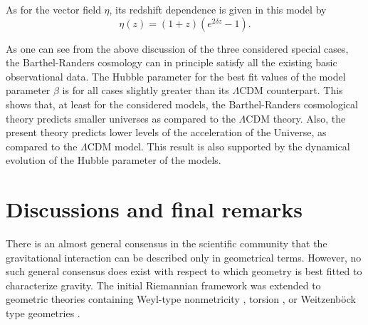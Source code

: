 \documentclass[aps,superscriptaddress, showpacs,preprintnumbers, superscriptaddress, nofootinbibt,twocolumn]{revtex4-2}
\def\be{\begin{equation}}
\def\ee{\end{equation}}
\begin{document}
As for the vector field $\eta$, its redshift dependence is given in this model by
\be
\eta (z)=(1+z)\left(e^{2\delta z}-1\right).
\ee

As one can see from the above discussion of the three considered special cases, the Barthel-Randers cosmology can in principle satisfy all the existing basic observational data. The Hubble parameter for the best fit values of the model parameter $\beta$ is for all cases slightly greater than its $\Lambda$CDM counterpart. This shows that, at least for the considered models, the Barthel-Randers cosmological theory predicts smaller universes as compared to the $\Lambda$CDM theory. Also, the present theory predicts lower levels of the acceleration of the Universe, as  compared to the $\Lambda$CDM model. This result is also supported by the dynamical evolution of the Hubble parameter of the models.

\section{Discussions and final remarks}\label{sect6}

There is an almost general consensus in the scientific community that the gravitational interaction can be described only in geometrical terms. However, no such general consensus does exist with respect to which geometry is best fitted to characterize gravity. The initial Riemannian framework was extended to geometric theories containing Weyl-type nonmetricity \cite{W1,W2,Q1}, torsion \cite{r10}, or Weitzenb\"{o}ck type geometries \cite{r16,r17}.
\end{document}
